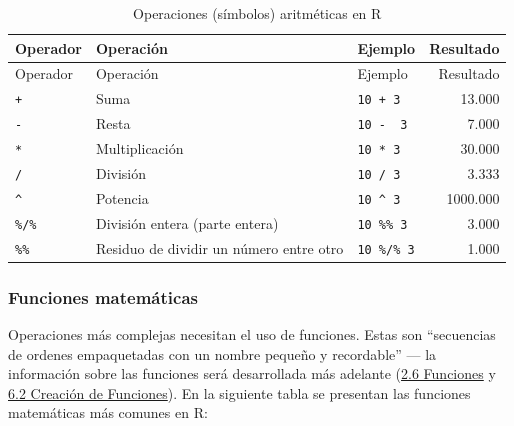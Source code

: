 \documentclass[
]{article}
\theoremstyle{definition}
\theoremstyle{definition}
\theoremstyle{definition}
\theoremstyle{definition}
\theoremstyle{remark}
\begin{document}
\begin{longtable}[]{@{}lllr@{}}
\caption{\label{tab:unnamed-chunk-5}Operaciones (símbolos) aritméticas en R}\tabularnewline
\toprule()
Operador & Operación & Ejemplo & Resultado \\
\midrule()
\endfirsthead
\toprule()
Operador & Operación & Ejemplo & Resultado \\
\midrule()
\endhead
\texttt{+} & Suma & \texttt{10\ +\ 3} & 13.000 \\
\texttt{-} & Resta & \texttt{10\ -\ \ 3} & 7.000 \\
\texttt{*} & Multiplicación & \texttt{10\ *\ 3} & 30.000 \\
\texttt{/} & División & \texttt{10\ /\ 3} & 3.333 \\
\texttt{\^{}} & Potencia & \texttt{10\ \^{}\ 3} & 1000.000 \\
\texttt{\%/\%} & División entera (parte entera) & \texttt{10\ \%\%\ 3} & 3.000 \\
\texttt{\%\%} & Residuo de dividir un número entre otro & \texttt{10\ \%/\%\ 3} & 1.000 \\
\bottomrule()
\end{longtable}

\hypertarget{funciones-matemuxe1ticas}{%
\subsubsection{Funciones matemáticas}\label{funciones-matemuxe1ticas}}

Operaciones más complejas necesitan el uso de funciones. Estas son ``secuencias de ordenes empaquetadas con un nombre pequeño y recordable'' --- la información sobre las funciones será desarrollada más adelante (\protect\hyperlink{funciones}{2.6 Funciones} y \protect\hyperlink{creacion-fun}{6.2 Creación de Funciones}). En la siguiente tabla se presentan las funciones matemáticas más comunes en R:
\end{document}
